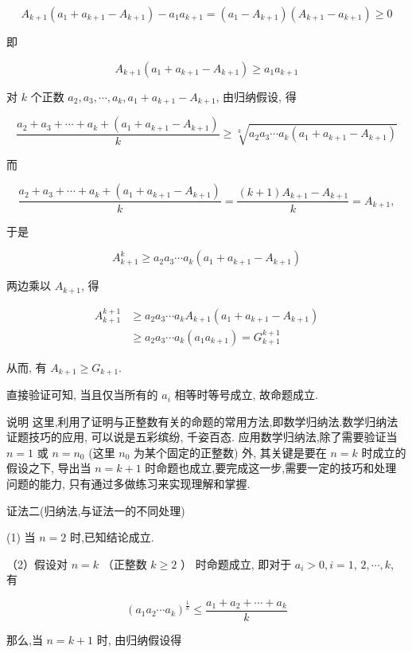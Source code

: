 $$
A_{k+1}\left(a_{1}+a_{k+1}-A_{k+1}\right)-a_{1} a_{k+1}=\left(a_{1}-A_{k+1}\right)\left(A_{k+1}-a_{k+1}\right) \geqslant 0
$$

即

$$
A_{k+1}\left(a_{1}+a_{k+1}-A_{k+1}\right) \geqslant a_{1} a_{k+1}
$$

对 $k$ 个正数 $a_{2}, a_{3}, \cdots, a_{k}, a_{1}+a_{k+1}-A_{k+1}$, 由归纳假设, 得

$$
\frac{a_{2}+a_{3}+\cdots+a_{k}+\left(a_{1}+a_{k+1}-A_{k+1}\right)}{k} \geqslant \sqrt[k]{a_{2} a_{3} \cdots a_{k}\left(a_{1}+a_{k+1}-A_{k+1}\right)}
$$

而

$$
\frac{a_{2}+a_{3}+\cdots+a_{k}+\left(a_{1}+a_{k+1}-A_{k+1}\right)}{k}=\frac{(k+1) A_{k+1}-A_{k+1}}{k}=A_{k+1},
$$

于是

$$
A_{k+1}^{k} \geqslant a_{2} a_{3} \cdots a_{k}\left(a_{1}+a_{k+1}-A_{k+1}\right)
$$

两边乘以 $A_{k+1}$, 得

$$
\begin{aligned}
A_{k+1}^{k+1} & \geqslant a_{2} a_{3} \cdots a_{k} A_{k+1}\left(a_{1}+a_{k+1}-A_{k+1}\right) \\
& \geqslant a_{2} a_{3} \cdots a_{k}\left(a_{1} a_{k+1}\right)=G_{k+1}^{k+1}
\end{aligned}
$$

从而, 有 $A_{k+1} \geqslant G_{k+1}$.

直接验证可知, 当且仅当所有的 $a_{i}$ 相等时等号成立, 故命题成立.

说明 这里,利用了证明与正整数有关的命题的常用方法,即数学归纳法.数学归纳法证题技巧的应用, 可以说是五彩缤纷, 千姿百态. 应用数学归纳法,除了需要验证当 $n=1$ 或 $n=n_{0}$ (这里 $n_{0}$ 为某个固定的正整数) 外, 其关键是要在 $n=k$ 时成立的假设之下, 导出当 $n=k+1$ 时命题也成立,要完成这一步,需要一定的技巧和处理问题的能力, 只有通过多做练习来实现理解和掌握.

证法二(归纳法,与证法一的不同处理)

(1) 当 $n=2$ 时,已知结论成立.

（2）假设对 $n=k$ （正整数 $k \geqslant 2$ ） 时命题成立, 即对于 $a_{i}>0, i=1$, $2, \cdots, k$, 有

$$
\left(a_{1} a_{2} \cdots a_{k}\right)^{\frac{1}{k}} \leqslant \frac{a_{1}+a_{2}+\cdots+a_{k}}{k}
$$

那么,当 $n=k+1$ 时, 由归纳假设得


